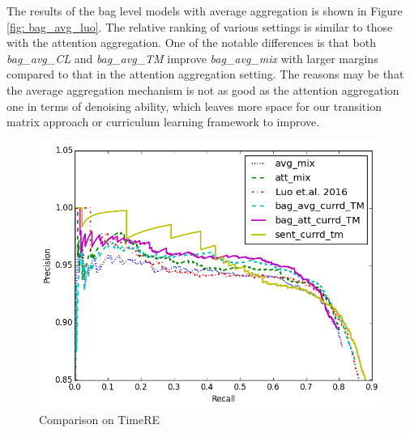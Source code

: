 The results of the bag level models with average aggregation is shown in Figure \ref{fig: bag_avg_luo}. The relative ranking of various settings is similar to those with the attention aggregation.  One of the notable differences is that both \emph{bag\_avg\_CL} and \emph{bag\_avg\_TM} improve \emph{bag\_avg\_mix} with larger margins compared to that in the attention aggregation setting. The reasons may be that the average aggregation mechanism is not as good as the attention aggregation one in terms of denoising ability, which leaves more space for our transition matrix approach or curriculum learning framework to improve.   
 
\begin{figure}[htbp]
\begin{center}
\includegraphics[width=0.9\linewidth]{figures/best_cmp_exp_overall.png}
\caption{Comparison on TimeRE}
\label{fig: cmp_luo}
\end{center}
\end{figure}
 
